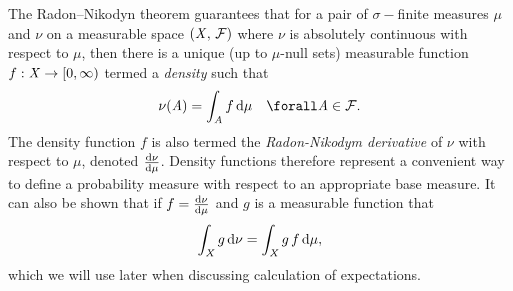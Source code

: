 The Radon--Nikodyn theorem \citep{} guarantees that for a pair of $\sigma-$finite measures $\mu$ and $\nu$ on a measurable space $(\mathit{X},\,\mathcal{F})$ where $\nu$ is absolutely continuous with respect to $\mu$,  then there is a unique (up to $\mu$-null sets) measurable function $f : \mathit{X} \to [0,\infty)$ termed a \emph{density} such that
\begin{equation}\label{eq:radon-nikodym}
  \nu(\set{A}) = \int_{\set{A}} f\,\dr\mu
  \quad \forall \set{A} \in \sset{F}.
\end{equation}
The density function $f$ is also termed the \emph{Radon-Nikodym derivative} of $\nu$ with respect to $\mu$, denoted $\frac{\mathrm{d} \nu}{\mathrm{d} \mu}$. Density functions therefore represent a convenient way to define a probability measure with respect to an appropriate base measure. %
It can also be shown that if $f = \frac{\mathrm{d} \nu}{\mathrm{d} \mu}$ and  $g$ is a 	 measurable function that
\begin{equation}\label{eq:integral-wrt-density}
  \int_{\mathit{X}} g\,\mathrm{d}\nu = \int_{\mathit{X}} g\, f\,\mathrm{d}\mu,
\end{equation}
which we will use later when discussing calculation of expectations.

